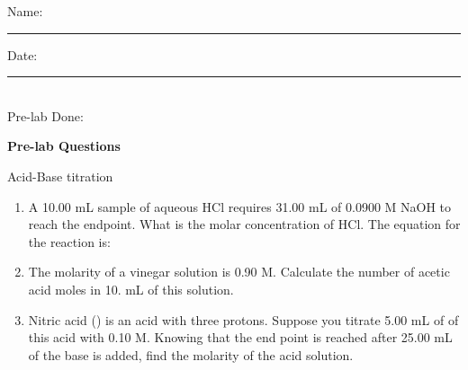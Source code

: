 \documentclass[main.tex]{subfiles}
\begin{document}
\restoregeometry





\begin{fullwidth}


\begin{multicols}{2}
\begin{tcolorbox}[enhanced jigsaw,breakable,size=title,
colback=mybrown!05,colframe=black,fonttitle=\bfseries,
title=STUDENT INFO,pad at break=1mm, break at=15cm/0pt ]
\vspace{0.2cm}
\noindent Name: \rule{5cm}{0.4pt}Date:\rule{1cm}{0.4pt}\\
Pre-lab Done: \quad
\end{tcolorbox}
\end{multicols}
\hfill
\vspace{0.2cm}
\begin{center}
{\large \bfseries 
Pre-lab Questions 
\par
\Huge
Acid-Base titration
\\[5pt] \par}
\vspace{0.2cm}
\end{center}
\par
\noindent
\uline{  \hfill \normalsize \hfill       }

\begin{enumerate}
\item A 10.00 mL sample of aqueous HCl requires 31.00 mL of 0.0900 M NaOH to reach the endpoint. What is the molar concentration of HCl. The equation for the reaction is:\\
\begin{center}\end{center}\vspace{3cm}
\item The molarity of a vinegar solution is 0.90 M. Calculate the number of acetic acid moles in 10. mL of this solution.\vspace{4cm}

\item  Nitric acid () is an acid with three protons. Suppose you titrate 5.00 mL of of this acid with  0.10 M. Knowing that the end point is reached after 25.00 mL of the base is added, find the molarity of the acid solution.\vspace{4cm}





\end{enumerate}
\end{fullwidth}
\end{document}
